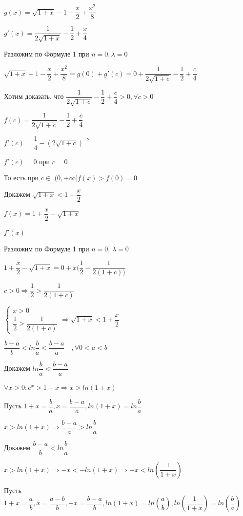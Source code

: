 \documentclass[12pt, a4paper]{article}
\begin{document}
$g(x) = \sqrt{1 + x} - 1 - \dfrac{x}{2} + \dfrac{x^2}{8}$

$g'(x) = \dfrac{1}{2\sqrt{1 + x}} - \dfrac{1}{2} + \dfrac{x}{4}$

Разложим по Формуле 1 при $n = 0, \lambda = 0 $

$\sqrt{1 + x} - 1 - \dfrac{x}{2} + \dfrac{x^2}{8} = g(0) + g'(c) = 0 + \dfrac{1}{2\sqrt{1 + c}} - \dfrac{1}{2} + \dfrac{c}{4}$

Хотим доказать, что $\dfrac{1}{2\sqrt{1 + c}} - \dfrac{1}{2} + \dfrac{c}{4} > 0, \forall c > 0$

$f(c) = \dfrac{1}{2\sqrt{1 + c}} - \dfrac{1}{2} + \dfrac{c}{4}$

$f'(c) = \dfrac{1}{4} - (2\sqrt{1 + c})^{-2}$

$f'(c) = 0$ при $c = 0$

То есть при $c \in $ $(0, +\infty] f(x) > f(0) = 0$

Докажем $\sqrt{1 + x} < 1 + \dfrac{x}{2}$ 

$f(x) = 1 + \dfrac{x}{2} - \sqrt{1 + x}$ 

$f'(x)$

Разложим по Формуле 1 при $n = 0$, $\lambda = 0$

$1 + \dfrac{x}{2} - \sqrt{1 + x} = 0 + x(\dfrac{1}{2} - \dfrac{1}{2(1 + c))}$

$c > 0 \Rightarrow \dfrac{1}{2} > \dfrac{1}{2(1 + c)}$

$\begin{cases}
	x > 0\\
	\dfrac{1}{2} > \dfrac{1}{2(1 + c)}
\end{cases} \Rightarrow \sqrt{1 + x} < 1 + \dfrac{x}{2}$

\sp $\dfrac{b - a}{b} < ln \dfrac{b}{a} < \dfrac{b - a}{a} \quad , \forall 0 < a < b$

Докажем $ln \dfrac{b}{a} < \dfrac{b - a}{a}$

$\forall x > 0: e^x > 1 + x \Rightarrow x > ln(1 + x)$

Пусть $1 + x = \dfrac{b}{a}, x = \dfrac{b - a}{a}, ln(1 + x) = ln\dfrac{b}{a}$

$x > ln(1 + x) \Rightarrow \dfrac{b - a}{a} > ln\dfrac{b}{a}$

Докажем $\dfrac{b - a}{b} < ln \dfrac{b}{a}$

$x > ln(1 + x) \Rightarrow -x < -ln(1 + x) \Rightarrow -x < ln(\dfrac{1}{1 + x}) $

Пусть $1 + x = \dfrac{a}{b}, x = \dfrac{a - b}{b}, -x = \dfrac{b - a}{b}, ln(1 + x) = ln(\dfrac{a}{b}), ln(\dfrac{1}{1 + x}) = ln(\dfrac{b}{a})$
\end{document}

